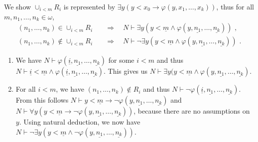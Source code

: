 \documentclass[a4paper,11pt]{article}
\begin{document}
\begin{description}
We show $\cup_{i < m}R_i$ is represented by $\exists y (y\!<\!x_0 \rightarrow \varphi(y, x_1, \ldots, x_k))$,
thus for all $m, n_1, \ldots, n_k \in \omega$,
\begin{align*}
  (n_1, \ldots, n_k) \in \cup_{i < m}R_i \quad &\Rightarrow \quad N \vdash \exists y (y\!<\!\underline{m} \wedge \varphi(y, \underline{n_1}, \ldots, \underline{n_k})) \text{ ,} \tag{iii} \\
  (n_1, \ldots, n_k) \notin \cup_{i < m}R_i \quad &\Rightarrow \quad N \vdash \neg \exists y (y\!<\!\underline{m} \wedge \varphi(y, \underline{n_1}, \ldots, \underline{n_k})) \text{ .} \tag{iv}
\end{align*}
\begin{enumerate}[start=3,label=(\roman*)]
\item We have $N \vdash \varphi(\underline{i}, \underline{n_1}, \ldots, \underline{n_k})$ for some $i < m$
  and thus $N \vdash \underline{i}\!<\!\underline{m} \wedge \varphi(\underline{i}, \underline{n_1}, \ldots, \underline{n_k})$.
  This gives us $N \vdash \exists y (y\!<\!\underline{m} \wedge \varphi(y, \underline{n_1}, \ldots, \underline{n_k})$.
\item For all $i < m$, we have $(n_1, \ldots, n_k) \notin R_i$ and thus $N \vdash \neg \varphi(\underline{i}, \underline{n_1}, \ldots, \underline{n_k})$.
  From this follows $N \vdash y\!<\!\underline{m} \rightarrow \neg \varphi(y, \underline{n_1}, \ldots, \underline{n_k})$
  and $N \vdash \forall y (y\!<\!\underline{m} \rightarrow \neg \varphi(y, \underline{n_1}, \ldots, \underline{n_k}))$,
  because there are no assumptions on $y$. Using natural deduction, we now have
  $N \vdash \neg \exists y (y\!<\!\underline{m} \wedge \neg \varphi(y, \underline{n_1}, \ldots, \underline{n_k}))$.
\end{enumerate}

\end{description}
\end{document}
